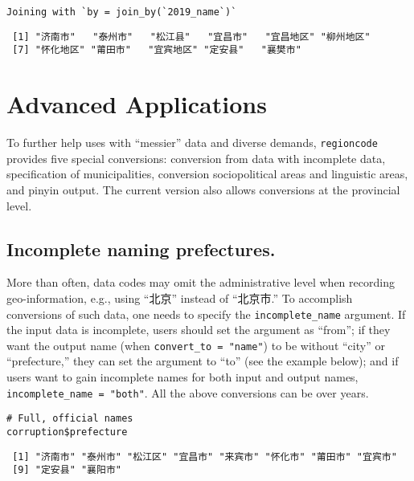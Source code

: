 \documentclass[
  article]{jss}
\begin{document}
\begin{verbatim}
Joining with `by = join_by(`2019_name`)`
\end{verbatim}

\begin{verbatim}
 [1] "济南市"   "泰州市"   "松江县"   "宜昌市"   "宜昌地区" "柳州地区"
 [7] "怀化地区" "莆田市"   "宜宾地区" "定安县"   "襄樊市"  
\end{verbatim}

\hypertarget{advanced-applications}{%
\section{Advanced Applications}\label{advanced-applications}}

To further help uses with ``messier'' data and diverse demands,
\texttt{regioncode} provides five special conversions: conversion from
data with incomplete data, specification of municipalities, conversion
sociopolitical areas and linguistic areas, and pinyin output. The
current version also allows conversions at the provincial level.

\hypertarget{incomplete-naming-prefectures.}{%
\subsection{Incomplete naming
prefectures.}\label{incomplete-naming-prefectures.}}

More than often, data codes may omit the administrative level when
recording geo-information, e.g., using ``北京'' instead of ``北京市.''
To accomplish conversions of such data, one needs to specify the
\texttt{incomplete\_name} argument. If the input data is incomplete,
users should set the argument as ``from''; if they want the output name
(when \texttt{convert\_to\ =\ "name"}) to be without ``city'' or
``prefecture,'' they can set the argument to ``to'' (see the example
below); and if users want to gain incomplete names for both input and
output names, \texttt{incomplete\_name\ =\ "both"}. All the above
conversions can be over years.

\begin{verbatim}
# Full, official names
corruption$prefecture
\end{verbatim}

\begin{verbatim}
 [1] "济南市" "泰州市" "松江区" "宜昌市" "来宾市" "怀化市" "莆田市" "宜宾市"
 [9] "定安县" "襄阳市"
\end{verbatim}
\end{document}
